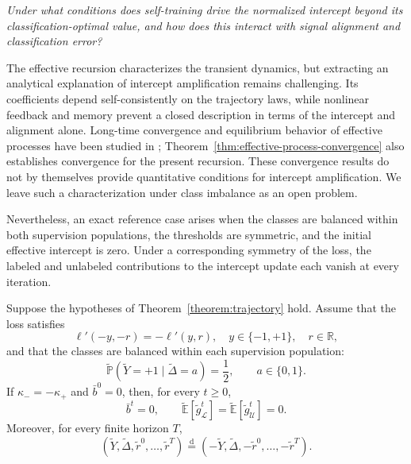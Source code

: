 \medskip
\emph{Under what conditions does self-training drive the
normalized intercept beyond its classification-optimal value,
and how does this interact with signal alignment and
classification error?}
\medskip

The effective recursion characterizes the transient dynamics,
but extracting an analytical explanation of intercept
amplification remains challenging.
Its coefficients depend self-consistently on the trajectory
laws, while nonlinear feedback and memory prevent a closed
description in terms of the intercept and alignment alone.
Long-time convergence and equilibrium behavior of effective
processes have been studied in
\cite{celentano2026highdimensionalasymptoticsordermethods,
fan2025dynamicalmeanfieldanalysisadaptivereplica,
chen2025learningsingleindexmodel};
Theorem~\ref{thm:effective-process-convergence} also establishes
convergence for the present recursion.
These convergence results do not by themselves provide
quantitative conditions for intercept amplification.
We leave such a characterization under class imbalance
as an open problem.

Nevertheless, an exact reference case arises when the classes
are balanced within both supervision populations, the thresholds
are symmetric, and the initial effective intercept is zero.
Under a corresponding symmetry of the loss, the labeled and
unlabeled contributions to the intercept update each vanish
at every iteration.

\begin{proposition}
\label{prop:zero-intercept-symmetry}
Suppose the hypotheses of Theorem~\ref{theorem:trajectory}
hold. Assume that the loss satisfies
\begin{equation}
    \ell'(-y,-r)=-\ell'(y,r),
    \quad y\in\{-1,+1\},\quad r\in\mathbb R,
    \label{eq:loss-label-score-symmetry}
\end{equation}
and that the classes are balanced within each supervision
population:
\begin{equation}
    \tilde{\mathbb P}(\tilde Y=+1\mid\tilde\Delta=a)
    =\frac12,
    \qquad a\in\{0,1\}.
    \label{eq:balance-within-supervision}
\end{equation}
If $\kappa_-=-\kappa_+$ and $\bar b^0=0$,
then, for every $t\geq0$,
\begin{equation}
    \bar b^t=0,
    \qquad
    \tilde{\mathbb E}[\tilde g_{\mathcal L}^t]
    =
    \tilde{\mathbb E}[\tilde g_{\mathcal U}^t]
    =0.
    \label{eq:zero-intercept-all-times}
\end{equation}
Moreover, for every finite horizon $T$,
\begin{equation}
    (\tilde Y,\tilde\Delta,\tilde r^0,\ldots,\tilde r^T)
    \overset{\mathrm d}{=}
    (-\tilde Y,\tilde\Delta,-\tilde r^0,\ldots,-\tilde r^T).
    \label{eq:joint-score-reflection}
\end{equation}
\end{proposition}

